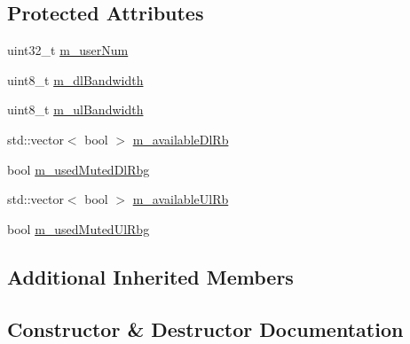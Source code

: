 \subsection*{Protected Attributes}
\begin{DoxyCompactItemize}
\item 
uint32\+\_\+t \hyperlink{classLteFrTestCase_a0fd46ca7afd0126775b0dfe0e082d634}{m\+\_\+user\+Num}
\item 
uint8\+\_\+t \hyperlink{classLteFrTestCase_ab4b1f8a24761500e981be4188f37e4a7}{m\+\_\+dl\+Bandwidth}
\item 
uint8\+\_\+t \hyperlink{classLteFrTestCase_abc41d1a6e64783aec279b400fc5e0076}{m\+\_\+ul\+Bandwidth}
\item 
std\+::vector$<$ bool $>$ \hyperlink{classLteFrTestCase_a6954d8d3db01c43d27e9ed044abbea45}{m\+\_\+available\+Dl\+Rb}
\item 
bool \hyperlink{classLteFrTestCase_a57b4d14dd22adfb64572dce3602703e2}{m\+\_\+used\+Muted\+Dl\+Rbg}
\item 
std\+::vector$<$ bool $>$ \hyperlink{classLteFrTestCase_ab3e7226c39c2ef666bbe21d6e6ebbc85}{m\+\_\+available\+Ul\+Rb}
\item 
bool \hyperlink{classLteFrTestCase_ae54b6fb11ce52cc697928f18f6a4e6c2}{m\+\_\+used\+Muted\+Ul\+Rbg}
\end{DoxyCompactItemize}
\subsection*{Additional Inherited Members}


\subsection{Constructor \& Destructor Documentation}
